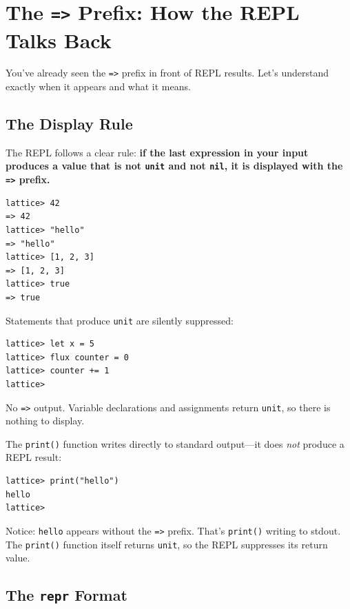 \section{The \texttt{=>} Prefix: How the REPL Talks Back}\label{sec:repl-output}

You've already seen the \lstinline|=>| prefix in front of REPL results.
Let's understand exactly when it appears and what it means.

\subsection{The Display Rule}\label{subsec:display-rule}

The REPL follows a clear rule: \textbf{if the last expression in your input produces a value that is not \lstinline|unit| and not \lstinline|nil|, it is displayed with the \lstinline|=>| prefix.}

\begin{lstlisting}[language=Lattice, numbers=none]
lattice> 42
=> 42
lattice> "hello"
=> "hello"
lattice> [1, 2, 3]
=> [1, 2, 3]
lattice> true
=> true
\end{lstlisting}

Statements that produce \lstinline|unit| are silently suppressed:

\begin{lstlisting}[language=Lattice, numbers=none]
lattice> let x = 5
lattice> flux counter = 0
lattice> counter += 1
lattice>
\end{lstlisting}

No \lstinline|=>| output.
Variable declarations and assignments return \lstinline|unit|, so there is nothing to display.

The \lstinline|print()| function writes directly to standard output---it does \emph{not} produce a REPL result:

\begin{lstlisting}[language=Lattice, numbers=none]
lattice> print("hello")
hello
lattice>
\end{lstlisting}

Notice: \lstinline|hello| appears without the \lstinline|=>| prefix.
That's \lstinline|print()| writing to stdout.
The \lstinline|print()| function itself returns \lstinline|unit|, so the REPL suppresses its return value.

\subsection{The \texttt{repr} Format}\label{subsec:repr-format}

